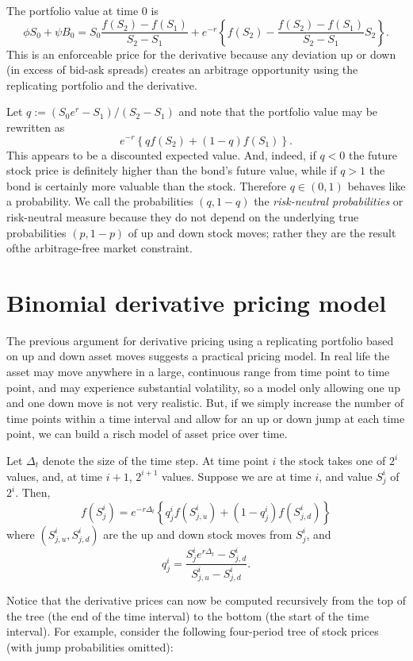 \documentclass[
]{book}
\begin{document}
The portfolio value at time 0 is
\[\phi S_0 + \psi B_0 = S_0 \frac{f(S_2)-f(S_1)}{S_2 - S_1} + e^{-r}\left\{f(S_2) - \frac{f(S_2)-f(S_1)}{S_2 - S_1}S_2\right\}.\]
This is an enforceable price for the derivative because any deviation up or down (in excess of bid-ask spreads) creates an arbitrage opportunity using the replicating portfolio and the derivative.

Let \(q := (S_0 e^r - S_1)/(S_2-S_1)\) and note that the portfolio value may be rewritten as
\[e^{-r}\left\{qf(S_2) + (1-q)f(S_1)\right\}.\]
This appears to be a discounted expected value. And, indeed, if \(q<0\) the future stock price is definitely higher than the bond's future value, while if \(q>1\) the bond is certainly more valuable than the stock. Therefore \(q\in (0,1)\) behaves like a probability. We call the probabilities \((q,1-q)\) the \emph{risk-neutral probabilities} or risk-neutral measure because they do not depend on the underlying true probabilities \((p,1-p)\) of up and down stock moves; rather they are the result ofthe arbitrage-free market constraint.

\hypertarget{binomial-derivative-pricing-model}{%
\section{Binomial derivative pricing model}\label{binomial-derivative-pricing-model}}

The previous argument for derivative pricing using a replicating portfolio based on up and down asset moves suggests a practical pricing model. In real life the asset may move anywhere in a large, continuous range from time point to time point, and may experience substantial volatility, so a model only allowing one up and one down move is not very realistic. But, if we simply increase the number of time points within a time interval and allow for an up or down jump at each time point, we can build a risch model of asset price over time.

Let \(\Delta_t\) denote the size of the time step. At time point \(i\) the stock takes one of \(2^i\) values, and, at time \(i+1\), \(2^{i+1}\) values. Suppose we are at time \(i\), and value \(S_j^i\) of \(2^{i}\). Then,
\[f(S_j^i) = e^{-r\Delta_t}\left\{q_j^if(S_{j,u}^i)+(1-q_j^i)f(S_{j,d}^i)\right\}\]
where \((S_{j,u}^i, S_{j,d}^i)\) are the up and down stock moves from \(S_j^i\), and
\[q_j^i = \frac{S_j^i e^{r\Delta_t} - S_{j,d}^i}{S_{j,u}^i-S_{j,d}^i}.\]

Notice that the derivative prices can now be computed recursively from the top of the tree (the end of the time interval) to the bottom (the start of the time interval). For example, consider the following four-period tree of stock prices (with jump probabilities omitted):
\end{document}
